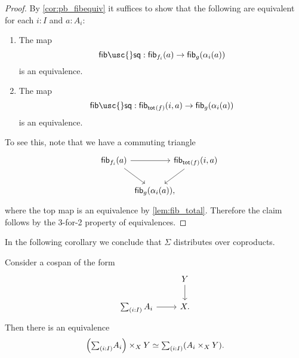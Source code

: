\begin{proof}
By \cref{cor:pb_fibequiv} it suffices to show that the following are equivalent for each $i:I$ and $a:A_i$:
\begin{enumerate}
\item The map
\begin{equation*}
\mathsf{fib\usc{}sq} : \fib{f_i}{a} \to \fib{g}{\alpha_i(a)}
\end{equation*}
is an equivalence.
\item The map
\begin{equation*}
\mathsf{fib\usc{}sq} : \fib{\total{f}}{i,a}\to \fib{g}{\alpha_i(a)}
\end{equation*}
is an equivalence.
\end{enumerate}
To see this, note that we have a commuting triangle
\begin{equation*}
\begin{tikzcd}[column sep=-1em]
\fib{f_i}{a} \arrow[rr] \arrow[dr] & & \fib{\total{f}}{i,a} \arrow[dl] \\
\phantom{\fib{\total{f}}{i,a}} & \fib{g}{\alpha_i(a)},
\end{tikzcd}
\end{equation*}
where the top map is an equivalence by \cref{lem:fib_total}. Therefore the claim follows by the 3-for-2 property of equivalences.
\end{proof}

In the following corollary we conclude that $\Sigma$ distributes over coproducts.

\begin{cor}
Consider a cospan of the form
\begin{equation*}
\begin{tikzcd}
& Y \arrow[d] \\
\sm{i:I}A_i \arrow[r] & X.
\end{tikzcd}
\end{equation*}
Then there is an equivalence
\begin{equation*}
\Big(\sm{i:I}A_i\Big)\times_X Y \simeq \sm{i:I} (A_i\times_X Y).
\end{equation*}
\end{cor}



